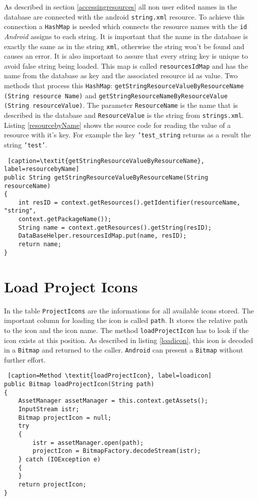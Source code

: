 As described in section \ref{accessingresources} all non user edited names in the database are connected with the android \texttt{string.xml} resource. To achieve this connection a \texttt{HashMap} is needed which connects the resource names with the \texttt{id} \textit{Android} assigns to each string. It is important that the name in the database is exactly the same as in the string \texttt{xml}, otherwise the string won't be found and causes an error. It is also important to assure that every string key is unique to avoid false string being loaded. This map is called \texttt{resourcesIdMap} and has the name from the database as key and the associated resource id as value. Two methods that process this \texttt{HashMap}: \texttt{getStringResourceValueByResourceName} \texttt{(String resource Name)} and \texttt{getStringResourceNameByResourceValue (String resourceValue)}. The parameter \texttt{ResourceName} is the name that is described in the database and \texttt{ResourceValue} is the string from \texttt{strings.xml}.\\
Listing \ref{resourcebyName} shows the source code for reading the value of a resource with it's key. For example the key \texttt{'test\_string} returns as a result the string \texttt{'test'}.
\begin{lstlisting} [caption=\textit{getStringResourceValueByResourceName}, label=resourcebyName] 
public String getStringResourceValueByResourceName(String resourceName)
{
	int resID = context.getResources().getIdentifier(resourceName, "string", 
	context.getPackageName());
	String name = context.getResources().getString(resID);
	DataBaseHelper.resourcesIdMap.put(name, resID);
	return name;
}
\end{lstlisting}

\section{Load Project Icons}\label{impl:loadProjectIcons}

In the table \texttt{ProjectIcons} are the informations for all available icons stored. The important column for loading the icon is called \texttt{path}. It stores the relative path to the icon and the icon name. The method \texttt{loadProjectIcon} has to look if the icon exists at this position. As described in listing \ref{loadicon}, this icon is decoded in a \texttt{Bitmap} and returned to the caller. \texttt{Android} can present a \texttt{Bitmap} without further effort.

\begin{lstlisting} [caption=Method \textit{loadProjectIcon}, label=loadicon] 
public Bitmap loadProjectIcon(String path)
{
	AssetManager assetManager = this.context.getAssets();
	InputStream istr;
	Bitmap projectIcon = null;
	try
	{
		istr = assetManager.open(path);
		projectIcon = BitmapFactory.decodeStream(istr);
	} catch (IOException e)
	{
	}
	return projectIcon;
}
\end{lstlisting}
